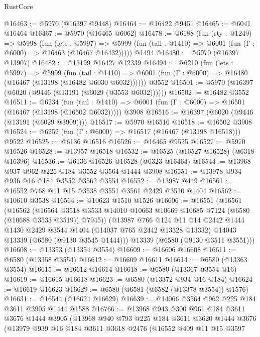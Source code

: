 \begin{lexlean}{RustCore}
\begin{coremodule}
@16463 := @5970 (@16397 @9448)
@16464 := @16422 @9451
@16465 := @6041 @16464
@16467 := @5970 (@16465 @6062)
@16478 := @6188
    (fun (rty : @1249) =>
    @5998
      (fun (lets : @5997) =>
      @5999 (fun (tail : @1410) => @6001 (fun (Γ : @6000) => @16463 (@16467 @16432)))))
    @1494
@16480 := @5970 (@16397 @13907)
@16482 := @13199 @16427 @12339
@16494 := @6210
    (fun (lets : @5997) =>
    @5999
      (fun (tail : @1410) =>
      @6001 (fun (Γ : @6000) => @16480 (@16467 (@13198 (@16482 @6030 @6032))))))
    @3552
@16501 := @5970 (@16397 (@6020 (@9446 (@13191 (@6029 (@3553 @6032))))))
@16502 := @16482 @3552
@16511 := @6234
    (fun (tail : @1410) => @6001 (fun (Γ : @6000) => @16501 (@16467 (@13198 (@16502 @6032)))))
    @3908
@16516 := @16397 (@6020 (@9446 (@13191 (@6029 @3909))))
@16517 := @5970 @16516
@16518 := @16502 @3908
@16524 := @6252 (fun (Γ : @6000) => @16517 (@16467 (@13198 @16518))) @9522
@16525 := @6136 @16516
@16526 := @16465 @9525
@16527 := @5970 @16526
@16528 := @13957 @16518
@16532 := @16525 (@16527 @16528) (@6318 @16396)
@16536 := @6136 @16526 @16528 (@6323 @16464)
@16544 := @13968 @937 @962 @225 @184 @3552 @3564 @1444 @3908
@16551 := @13978 @934 @936 @16 @184 @3552 @3562 @3554
@16552 := @13987 @449
@16561 := @16552 @768 @11 @15 @3538 @3551 @3561 @2429 @3510 @1404
@16562 := @10610 @3538
@16564 := @10623 @1510 @1526
@16606 := @16551
    (@16561
      (@16562
        (@16564 @3518 @3533 @14010 @10663 @10669 @10685 @7124 (@6580 (@10688 @3533 @3519)) @7945))
      (@13987
        @766
        @124
        @11
        @14
        @2442
        @1444
        @1430
        @2429
        @3544
        @1404
        (@14037 @765 @2442 @13328 @13332)
        @14043
        @13339
        (@6580 (@9130 @3545 @1444)))
      @13339
      (@6580 (@9130 @3511 @3551)))
@16608 := @13353 (@13354 @3554)
@16609 := @16606 @16608
@16611 := @6580 (@13358 @3554)
@16612 := @16609 @16611
@16614 := @6580 (@13363 @3554)
@16615 := @16612 @16614
@16618 := @6580 (@13367 @3554 @16)
@16619 := @16615 @16618
@16623 := @6580 (@13372 @934 @16 @184)
@16624 := @16619 @16623
@16629 := @6580 (@6581 (@6582 (@13378 @3554)) @1576)
@16631 := @16544 (@16624 @16629)
@16639 := @14066 @3564 @962 @225 @184 @3611 @3905 @1444 @1588
@16766 := @13968
    @943
    @300
    @961
    @184
    @3611
    @3676
    @1444
    @3905
    (@13968
      @940
      @793
      @225
      @184
      @3611
      @3620
      @1444
      @3676
      (@13979
        @939
        @16
        @184
        @3611
        @3618
        @2476
        (@16552
          @409
          @11
          @15
          @3597

\end{coremodule}
\end{lexlean}
